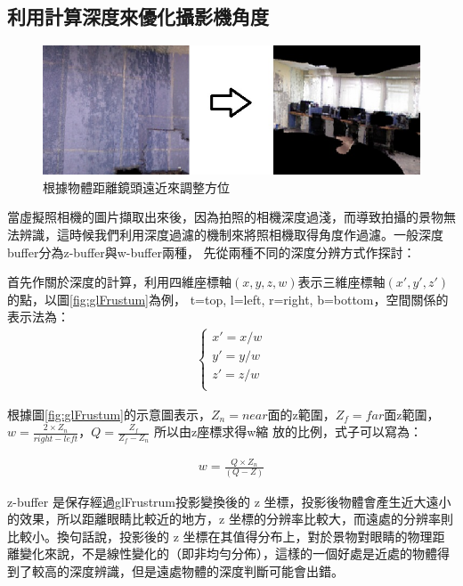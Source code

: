 \subsection{利用計算深度來優化攝影機角度}
%

	\begin{figure}
	\begin{center}
	  \includegraphics[width=1.0\textwidth]{figures/Depth_Filter.jpg}
	  \caption{根據物體距離鏡頭遠近來調整方位}
	  \label{fig:Depth_Filter}
	\end{center}
	\end{figure}

	當虛擬照相機的圖片擷取出來後，因為拍照的相機深度過淺，而導致拍攝的景物無法辨識，這時候我們利用深度過濾的機制來將照相機取得角度作過濾。一般深度buffer分為z-buffer與w-buffer兩種，
	先從兩種不同的深度分辨方式作探討：
	
	首先作關於深度的計算，利用四維座標軸$(x,y,z,w)$表示三維座標軸$(x',y',z')$的點，以圖\ref{fig:glFrustum}為例，
	t=top, l=left, r=right, b=bottom，空間關係的表示法為：
	\begin{align}
		\left\{
		\begin{array}{ccc}
		x' = x /w \\
		y' = y /w \\
		z' = z /w \\
		\end{array}
		\right.
	\end{align}
	
	根據圖\ref{fig:glFrustum}的示意圖表示，$Z_n = near$面的z範圍，$Z_f = far$面z範圍，$w = \frac{2 \times Z_n}{right-left}$，$Q = \frac{Z_f}{Z_f - Z_n}$ 所以由z座標求得w縮
	放的比例，式子可以寫為：
		
	\begin{align}
		w = \frac{Q\times Z_n}{(Q-Z)}
	\end{align}			
	
	z-buffer 是保存經過glFrustrum投影變換後的 z 坐標，投影後物體會產生近大遠小的效果，所以距離眼睛比較近的地方，z 坐標的分辨率比較大，而遠處的分辨率則比較小。換句話說，投影後的
    z 坐標在其值得分布上，對於景物對眼睛的物理距離變化來說，不是線性變化的（即非均勻分佈），這樣的一個好處是近處的物體得到了較高的深度辨識，但是遠處物體的深度判斷可能會出錯。 
    
